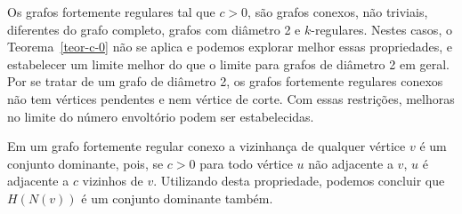 Os grafos fortemente regulares tal que $c>0$, são grafos conexos, não triviais, diferentes do grafo completo, grafos com diâmetro 2 e $k$-regulares. Nestes casos, o Teorema~\ref{teor-c-0} não se aplica e podemos explorar melhor essas propriedades, e estabelecer um limite melhor do que o limite para grafos de diâmetro 2 em geral. Por se tratar de um grafo de diâmetro 2, os grafos fortemente regulares conexos não tem vértices pendentes e nem vértice de corte. Com essas restrições, melhoras no limite do número envoltório podem ser estabelecidas. 


Em um grafo fortemente regular conexo a vizinhança de qualquer vértice $v$ é um conjunto dominante, pois, se $c>0$ para todo vértice $u$ não adjacente a $v$, $u$ é adjacente a $c$ vizinhos de $v$. Utilizando desta propriedade, podemos concluir que $H(N(v))$ é um conjunto dominante também.

